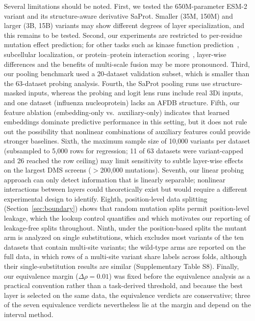 \documentclass[11pt,a4paper]{article}
\newcommand{\revised}[1]{#1}
\newcommand{\rtwo}[1]{#1}
\newcommand{\rthree}[1]{#1}
\begin{document}
Several limitations should be noted. First, we tested the 650M-parameter
ESM-2 variant and its structure-aware derivative SaProt. Smaller (35M, 150M)
and larger (3B, 15B) variants may show different degrees of layer specialization,
and this remains to be tested. Second, our
experiments are restricted to per-residue mutation effect prediction; for other
tasks such as kinase function prediction~\cite{kumar2025}, subcellular
localization, or protein--protein interaction scoring~\cite{elshaffei2025},
layer-wise differences and the benefits of multi-scale fusion may be more
pronounced. Third, our pooling benchmark used a 20-dataset validation subset,
which is smaller than the \revised{63}-dataset probing analysis. \revised{Fourth,
the SaProt pooling runs use structure-masked inputs, whereas the probing and logit
lens runs include real 3Di inputs, and one dataset (influenza nucleoprotein) lacks
an AFDB structure. Fifth, our}
feature ablation (embedding-only vs.\ auxiliary-only) indicates that learned embeddings
dominate predictive performance in this setting, but it does
not rule out the possibility that nonlinear combinations of auxiliary features
could provide stronger baselines.
\revised{Sixth,} the
maximum sample size of 10,000 \rtwo{variants} per dataset (subsampled to 5,000
\rtwo{rows} for regression\revised{; \rtwo{11 of 63 datasets were variant-capped and 26
reached the row ceiling}}) may limit sensitivity to
subtle layer-wise effects on the largest DMS screens ($>$200,000 mutations). \revised{Seventh,} our linear probing approach can only detect
information that is linearly separable; nonlinear interactions between layers
could theoretically exist but would require a different experimental design to
identify. \revised{Eighth}, position-level data splitting (Section~\rtwo{\ref{sec:boundary}}) shows that
random mutation splits permit position-level leakage, \revised{which the lookup
control quantifies and which motivates our reporting of leakage-free splits
throughout}\rtwo{\rthree{. Ninth, under the position-based splits the mutant arm is analyzed on
single substitutions, which excludes most variants of the ten datasets that contain
multi-site variants; the wild-type arms are reported on the full data, in which rows of
a multi-site variant share labels across folds, although their single-substitution
results are similar (Supplementary Table S8)}. Finally, our
equivalence margin ($\Delta\rho = 0.01$) was fixed before the equivalence analysis as
a practical convention rather than a task-derived threshold, and because the best
layer is selected on the same data, the equivalence verdicts are conservative\rthree{;
three of the seven equivalence verdicts nevertheless lie at the margin and depend on
the interval method}.}
\end{document}
